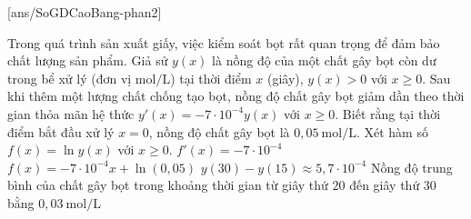 


\cauds
{}[ans/SoGDCaoBang-phan2]

\begin{ex}%
	Trong quá trình sản xuất giấy, việc kiểm soát bọt rất quan trọng để đảm bảo chất lượng sản phẩm. Giả sử $y(x)$ là nồng độ của một chất gây bọt còn dư trong bể xử lý (đơn vị $\mathrm{mol/L}$) tại thời điểm $x$ (giây), $y(x) > 0$ với $x \ge 0$. Sau khi thêm một lượng chất chống tạo bọt, nồng độ chất gây bọt giảm dần theo thời gian thỏa mãn hệ thức $y'(x) = -7 \cdot 10^{-4} y(x)$ với $x \ge 0$. Biết rằng tại thời điểm bắt đầu xử lý $x = 0$, nồng độ chất gây bọt là $0{,}05 \mathrm{~mol/L}$. Xét hàm số $f(x) = \ln y(x)$ với $x \ge 0$.
	\choiceTF
	{\True $f'(x) = -7 \cdot 10^{-4}$}
	{\True $f(x) = -7 \cdot 10^{-4} x + \ln(0{,}05)$}
	{$y(30) - y(15) \approx 5{,}7 \cdot 10^{-4}$}
	{Nồng độ trung bình của chất gây bọt trong khoảng thời gian từ giây thứ $20$ đến giây thứ $30$ bằng $0{,}03 \mathrm{~mol/L}$}
\end{ex}

